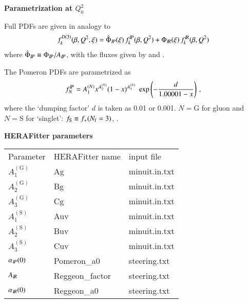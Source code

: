 {\bf Parametrization at {$Q_0^2$}} \\
\label{sec:Par}

Full PDFs are given in analogy to 
\begin{equation}
f_k^{D(3)}(\beta,Q^2,\xi) =
\hat\Phi_{I\!P}(\xi)\, f^{I\!P}_k(\beta,Q^2)
+
\Phi_{I\!R}(\xi)\, f^{I\!R}_k(\beta,Q^2)
\end{equation}
where $\hat\Phi_{I\!P} \equiv \Phi_{I\!P}/A_{I\!P}$,
with the fluxes given by  and .

The Pomeron PDFs are parametrized as
\def\Cini#1#2{A^{(#1)}_#2}
\begin{equation}
\label{eq:fP0}
f^\Pom_N = \Cini N1  x^{\Cini N2} (1-x)^{\Cini N3}
  \; \exp\left(-\frac{d}{1.00001-x}\right)
\,,
\end{equation}
where the `dumping factor' $d$ is taken as 0.01 or 0.001.
$N = \mathrm G$ for gluon and $N = \mathrm S$ for `singlet': $f_{\rm S} \equiv f_+(\NF=3)$,
\cf {}.


{\bf HERAFitter parameters} \\
\label{sec:HFitterPar}


\begin{tabular}{l|l|l}
Parameter & HERAFitter name & input file\\
$\Cini {\mathrm G}1$ & Ag & minuit.in.txt \\
$\Cini {\mathrm G}2$ & Bg & minuit.in.txt \\
$\Cini {\mathrm G}3$ & Cg & minuit.in.txt \\
$\Cini {\mathrm S}1$ & Auv & minuit.in.txt \\
$\Cini {\mathrm S}2$ & Buv & minuit.in.txt \\
$\Cini {\mathrm S}3$ & Cuv & minuit.in.txt \\
$\alpha_{I\!P}(0)$ & Pomeron\_a0 & steering.txt \\
$A_{I\!R}$ & Reggeon\_factor & steering.txt \\
$\alpha_{I\!R}(0)$ & Reggeon\_a0 & steering.txt \\
\end{tabular}

\endinput


